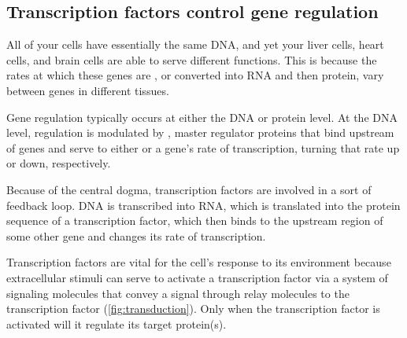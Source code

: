 
\subsection{Transcription factors control gene regulation}

All of your cells have essentially the same DNA, and yet your liver cells, heart cells, and brain cells are able to serve different functions. This is because the rates at which these genes are , or converted into RNA and then protein, vary between genes in different tissues.

Gene regulation typically occurs at either the DNA or protein level. At the DNA level, regulation is modulated by , master regulator proteins that bind upstream of genes and serve to either  or  a gene's rate of transcription, turning that rate up or down, respectively.

Because of the central dogma, transcription factors are involved in a sort of feedback loop. DNA is transcribed into RNA, which is translated into the protein sequence of a transcription factor, which then binds to the upstream region of some other gene and changes its rate of transcription.

Transcription factors are vital for the cell's response to its environment because extracellular stimuli can serve to activate a transcription factor via a system of signaling molecules that convey a signal through relay molecules to the transcription factor (\autoref{fig:transduction}). Only when the transcription factor is activated will it regulate its target protein(s).\\

